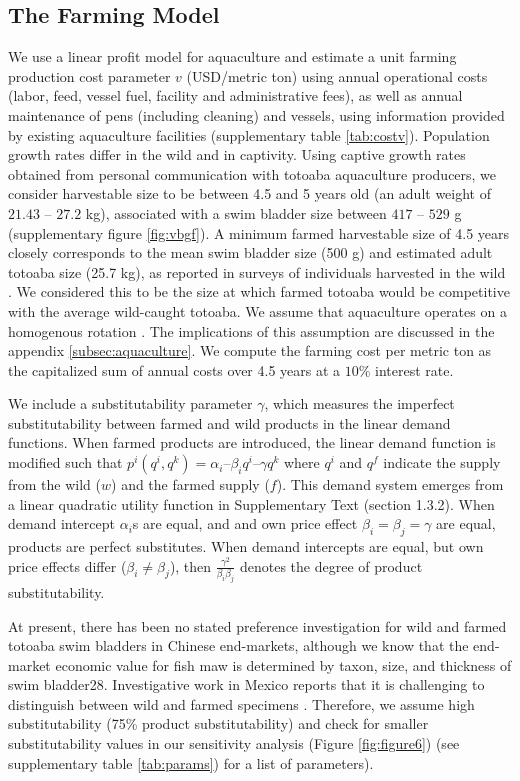 \subsection{The Farming Model}
We use a linear profit model for aquaculture and estimate a unit farming production cost parameter $v$ (USD/metric ton) using annual operational costs (labor, feed, vessel fuel, facility and administrative fees), as well as annual maintenance of pens (including cleaning) and vessels, using information provided by existing aquaculture facilities (supplementary table \ref{tab:costv}). Population growth rates differ in the wild and in captivity. Using captive growth rates obtained from personal communication with totoaba aquaculture producers, we consider harvestable size to be between 4.5 and 5 years old (an adult weight of $21.43$ – $27.2$ kg), associated with a swim bladder size between $417$ – $529$ g (supplementary figure \ref{fig:vbgf}). A minimum farmed harvestable size of 4.5 years closely corresponds to the mean swim bladder size (500 g) and estimated adult totoaba size (25.7 kg), as reported in surveys of individuals harvested in the wild \citep{cisneros-mata_evaluacion_2020}. We considered this to be the size at which farmed totoaba would be competitive with the average wild-caught totoaba. We assume that aquaculture operates on a homogenous rotation \citep{faustmann1849}. The implications of this assumption are discussed in the appendix \ref{subsec:aquaculture}. We compute the farming cost per metric ton as the capitalized sum of annual costs over 4.5 years at a $10\%$ interest rate.

We include a substitutability parameter $\gamma$, which measures the imperfect substitutability between farmed and wild products in the linear demand functions. When farmed products are introduced, the linear demand function is modified such that $p^i(q^i,q^k)=\alpha_i–\beta_i q^i–\gamma q^k$ where $q^i$ and $q^f$ indicate the supply from the wild ($w$) and the farmed supply ($f$). This demand system emerges from a linear quadratic utility function in Supplementary Text (section 1.3.2). When demand intercept $\alpha_i$s are equal, and and own price effect $\beta_i=\beta_j = \gamma$ are equal, products are perfect substitutes. When demand intercepts are equal, but own price effects differ ($\beta_i \neq \beta_j$), then $\frac{\gamma^2}{\beta_i \beta_j}$ denotes the degree of product substitutability. 

At present, there has been no stated preference investigation for wild and farmed totoaba swim bladders in Chinese end-markets, although we know that the end-market economic value for fish maw is determined by taxon, size, and thickness of swim bladder28. Investigative work in Mexico reports that it is challenging to distinguish between wild and farmed specimens \citep{elephant_action_league_operation_2018}. Therefore, we assume high substitutability (75\% product substitutability) and check for smaller substitutability values in our sensitivity analysis (Figure \ref{fig:figure6}) (see supplementary table \ref{tab:params}) for a list of parameters).

